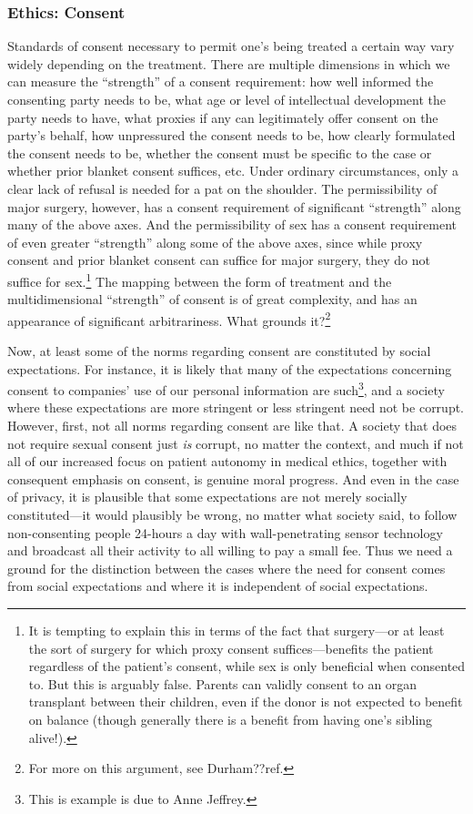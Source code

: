 \subsubsection{Ethics: Consent}
Standards of consent necessary to permit one's being treated a certain way vary widely depending on the treatment.
There are multiple dimensions in which we can measure the ``strength'' of a consent requirement: how well informed the 
consenting party needs to be, what age or level of intellectual development the party needs to have, what proxies if
any can legitimately offer consent on the party's behalf, how unpressured the consent needs to be, how clearly formulated the consent
needs to be, whether the consent must be specific to the case or whether prior blanket consent suffices, etc.
Under ordinary circumstances, only a clear lack of refusal is needed for a pat on the shoulder. The permissibility
of major surgery, however, has a consent requirement of significant ``strength'' along many of the above axes. 
And the permissibility of sex has a consent requirement of even greater ``strength'' along some of the above axes,
since while proxy consent and prior blanket consent can suffice for major surgery, they do not suffice for sex.\footnote{It is tempting
to explain this in terms of the fact that surgery---or at least the sort of surgery for which proxy consent suffices---benefits 
the patient regardless of the patient's consent, while sex is only beneficial when consented to. But this is arguably false.
Parents can validly consent to an organ transplant between their children, even if the donor is not expected to benefit
on balance (though generally there is a benefit from having one's sibling alive!).} The mapping between
the form of treatment and the multidimensional ``strength'' of consent is of great complexity, and has an appearance of significant
arbitrariness. What grounds it?\footnote{For more on this argument, see Durham??ref.}

Now, at least some of the norms regarding consent are constituted by social expectations. For instance, it is likely
that many of the expectations concerning consent to companies' use of our personal information are such\footnote{This
is example is due to Anne Jeffrey.}, and a society
where these expectations are more stringent or less stringent need not be corrupt. However, first, not all norms
regarding consent are like that. A society that does not require sexual consent just \textit{is} corrupt, no matter
the context, and much if not all of our increased focus on patient autonomy in medical ethics, together with consequent
emphasis on consent, is genuine moral progress. And even in the case of privacy, it is plausible that some
expectations are not merely socially constituted---it would plausibly be wrong, no matter what society
said, to follow non-consenting people 24-hours a day with wall-penetrating sensor technology and broadcast all 
their activity to all willing to pay a small fee. Thus we need a ground for the distinction between the cases where the 
need for consent comes from social expectations and where it is independent of social expectations. 

